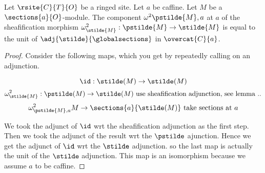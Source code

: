 \begin{lemma}
Let $\rsite{C}{T}{O}$ be a ringed site.
Let $a$ be caffine.
Let $M$ be a $\sections{a}{O}$-module.
The component $\omega^2{\pstilde{M},a}$ at $a$ 
of the sheafification morphism $\omega^2_{\stilde{M}}: \pstilde{M} \rightarrow \stilde{M}$ 
is equal to the unit of $\adj{\stilde}{\globalsections}$ in $\overcat{C}{a}$.
\end{lemma}

\begin{proof}
Consider the following maps, which you get by repeatedly calling on an adjunction.

\[\id :\stilde(M) \rightarrow \stilde(M)\]
\[\omega^2_{\stilde{M}} : \pstilde(M) \rightarrow \stilde(M) 
	\mbox{ use sheafification adjunction, see lemma ..}
\]
\[\omega^2_{\pstilde{M},a} M \rightarrow \sections{a}{\stilde(M)} \mbox{ take sections at $a$}\]

We took the adjunct of $\id$ wrt the sheafification adjunction as the first step.
Then we took the adjunct of the result wrt the $\pstilde$ ajunction.
Hence we get the adjunct of $\id$ wrt the $\stilde$ adjunction.
so the last map is actually the unit of the $\stilde$ adjunction.
This map is an isomorphism because we assume $a$ to be caffine.
\end{proof}
